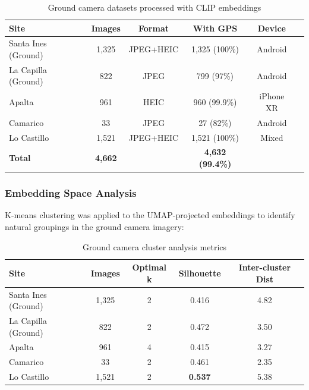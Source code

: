 \begin{table}[H]
\centering
\caption{Ground camera datasets processed with CLIP embeddings}
\label{tab:ground_summary}
\begin{tabular}{lccccc}
\toprule
\textbf{Site} & \textbf{Images} & \textbf{Format} & \textbf{With GPS} & \textbf{Device} \\
\midrule
Santa Ines (Ground) & 1,325 & JPEG+HEIC & 1,325 (100\%) & Android \\
La Capilla (Ground) & 822 & JPEG & 799 (97\%) & Android \\
Apalta & 961 & HEIC & 960 (99.9\%) & iPhone XR \\
Camarico & 33 & JPEG & 27 (82\%) & Android \\
Lo Castillo & 1,521 & JPEG+HEIC & 1,521 (100\%) & Mixed \\
\midrule
\textbf{Total} & \textbf{4,662} & & \textbf{4,632 (99.4\%)} & \\
\bottomrule
\end{tabular}
\end{table}

\subsubsection{Embedding Space Analysis}

K-means clustering was applied to the UMAP-projected embeddings to identify natural groupings in the ground camera imagery:

\begin{table}[H]
\centering
\caption{Ground camera cluster analysis metrics}
\label{tab:ground_clusters}
\begin{tabular}{lcccc}
\toprule
\textbf{Site} & \textbf{Images} & \textbf{Optimal k} & \textbf{Silhouette} & \textbf{Inter-cluster Dist} \\
\midrule
Santa Ines (Ground) & 1,325 & 2 & 0.416 & 4.82 \\
La Capilla (Ground) & 822 & 2 & 0.472 & 3.50 \\
Apalta & 961 & 4 & 0.415 & 3.27 \\
Camarico & 33 & 2 & 0.461 & 2.35 \\
Lo Castillo & 1,521 & 2 & \textbf{0.537} & 5.38 \\
\bottomrule
\end{tabular}
\end{table}


